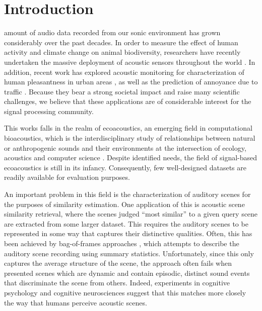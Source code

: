 \documentclass[journal]{IEEEtran}
\begin{document}
%
\IEEEpeerreviewmaketitle

\section{Introduction}

 amount of audio data recorded from our sonic environment has grown considerably over the past decades.
In order to measure the effect of human activity and climate change on animal biodiversity, researchers have recently undertaken the massive deployment of acoustic sensors throughout the world \cite{warren2006urban, NessSST13, stowell13b}. 
In addition, recent work has explored acoustic monitoring for characterization of human pleasantness in urban areas \cite{guyot2005urban, ricciardi2015sound}, as well as the prediction of annoyance due to traffic \cite{gloaguen}.
Because they bear a strong societal impact and raise many scientific challenges, we believe that these applications are of considerable interest for the signal processing community.

This works falls in the realm of ecoacoustics, an emerging field in computational bioacoustics, which is the interdisciplinary study of relationships between natural or anthropogenic sounds and their environments at the intersection of ecology, acoustics and computer science \cite{krause}. Despite identified needs, the field of signal-based ecoacoustics is still in its infancy.
Consequently, few well-designed datasets are readily available for evaluation purposes.

An important problem in this field is the characterization of auditory scenes for the purposes of similarity estimation. One application of this is acoustic scene similarity retrieval, where the scenes judged ``most similar'' to a given query scene are extracted from some larger dataset. This requires the auditory scenes to be represented in some way that captures their distinctive qualities. Often, this has been achieved by bag-of-frames approaches \cite{aucouturier2007bag}, which attempts to describe the auditory scene recording using summary statistics. Unfortunately, since this only captures the average structure of the scene, the approach often fails when presented scenes which are dynamic and contain episodic, distinct sound events that discriminate the scene from others. Indeed, experiments in cognitive psychology \cite{dubois2006cognitive} and cognitive neurosciences \cite{nelken2004processing} suggest that this matches more closely the way that humans perceive acoustic scenes. 
\end{document}
